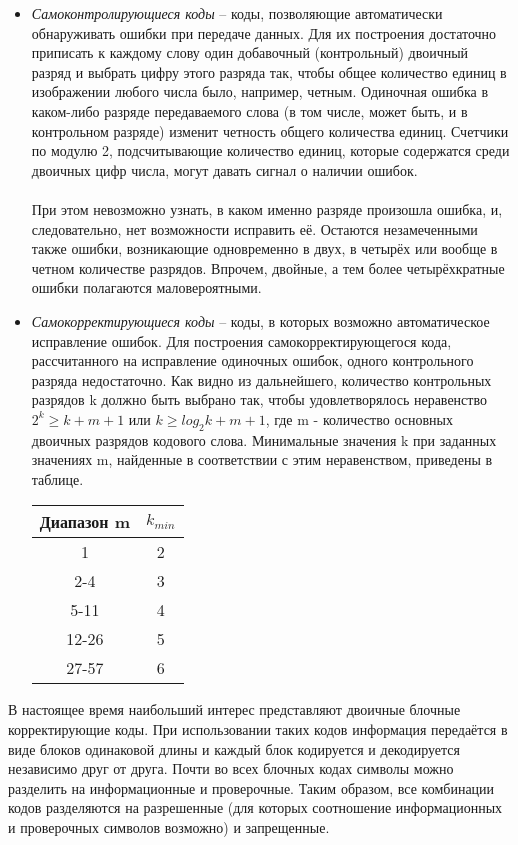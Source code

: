 \begin{itemize}
\item \emph{Самоконтролирующиеся коды} -- коды, позволяющие автоматически обнаруживать ошибки при передаче данных. Для их построения достаточно приписать к каждому слову один добавочный (контрольный) двоичный разряд и выбрать цифру этого разряда так, чтобы общее количество единиц в изображении любого числа было, например, четным. Одиночная ошибка в каком-либо разряде передаваемого слова (в том числе, может быть, и в контрольном разряде) изменит четность общего количества единиц. Счетчики по модулю 2, подсчитывающие количество единиц, которые содержатся среди двоичных цифр числа, могут давать сигнал о наличии ошибок.\\
\\При этом невозможно узнать, в каком именно разряде произошла ошибка, и, следовательно, нет возможности исправить её. Остаются незамеченными также ошибки, возникающие одновременно в двух, в четырёх или вообще в четном количестве разрядов. Впрочем, двойные, а тем более четырёхкратные ошибки полагаются маловероятными.
\item \emph{Самокорректирующиеся коды} -- коды, в которых возможно автоматическое исправление ошибок. Для построения самокорректирующегося кода, рассчитанного на исправление одиночных ошибок, одного контрольного разряда недостаточно. Как видно из дальнейшего, количество контрольных разрядов k должно быть выбрано так, чтобы удовлетворялось неравенство $2^k \ge k+m+1$ или $k \ge log_2{k+m+1}$, где m -  количество основных двоичных разрядов кодового слова. Минимальные значения k при заданных значениях m, найденные в соответствии с этим неравенством, приведены в таблице.

\begin{table}[h]
\begin{center}
\begin{tabular}{|c|c|}
\hline
 Диапазон m & $k_{min}$  \\
\hline
1 & 2 \\
\hline
2-4 & 3\\
\hline
5-11 & 4\\
\hline
12-26 & 5\\
\hline
27-57 & 6 \\
\hline
\end{tabular}
\end{center}
\end{table}
\end{itemize}
В настоящее время наибольший интерес представляют двоичные блочные корректирующие коды. При использовании таких кодов информация передаётся в виде блоков одинаковой длины и каждый блок кодируется и декодируется независимо друг от друга. Почти во всех блочных кодах символы можно разделить на информационные и проверочные. Таким образом, все комбинации кодов разделяются на разрешенные (для которых соотношение информационных и проверочных символов возможно) и запрещенные.\\
